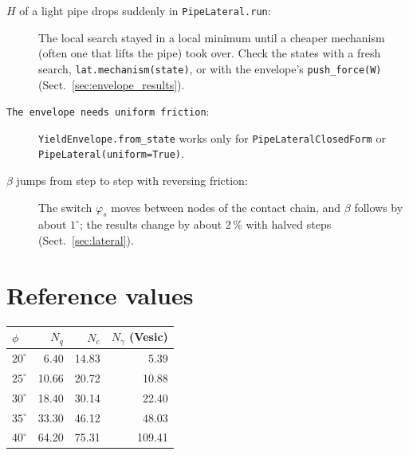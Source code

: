 \documentclass[11pt,a4paper]{article}
\newcommand{\Nc}{N_c}
\newcommand{\Ngamma}{N_\gamma}
\newcommand{\Nq}{N_q}
\begin{document}
\begin{description}
  \item[$H$ of a light pipe drops suddenly in \texttt{PipeLateral.run}:]
        The local search stayed in a local minimum until a cheaper
        mechanism (often one that lifts the pipe) took over.  Check the
        states with a fresh search, \texttt{lat.mechanism(state)}, or
        with the envelope's \texttt{push\_force(W)}
        (Sect.~\ref{sec:envelope_results}).

  \item[\texttt{The envelope needs uniform friction}:]
        \texttt{YieldEnvelope.from\_state} works only for
        \texttt{PipeLateralClosedForm} or
        \texttt{PipeLateral(uniform=True)}.

  \item[$\beta$ jumps from step to step with reversing friction:]
        The switch $\varphi_s$ moves between nodes of the contact
        chain, and $\beta$ follows by about $1^\circ$; the results
        change by about 2\,\% with halved steps
        (Sect.~\ref{sec:lateral}).
\end{description}

\section{Reference values}
\label{sec:ref}

\begin{center}
\begin{tabular}{lrrr}
\toprule
$\phi$ & $\Nq$ & $\Nc$ & $\Ngamma$ (Vesic) \\
\midrule
$20^\circ$ & 6.40  & 14.83 & 5.39  \\
$25^\circ$ & 10.66 & 20.72 & 10.88 \\
$30^\circ$ & 18.40 & 30.14 & 22.40 \\
$35^\circ$ & 33.30 & 46.12 & 48.03 \\
$40^\circ$ & 64.20 & 75.31 & 109.41 \\
\bottomrule
\end{tabular}
\end{center}
\end{document}
